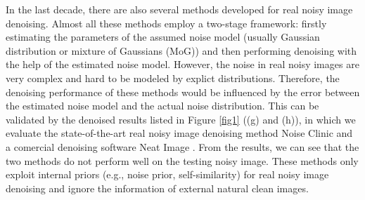 \documentclass[10pt,twocolumn,letterpaper]{article}
\begin{document}
In the last decade, there are also several methods \cite{crosschannel2016,fullyblind,rabie2005robust,Liu2008,almapg,noiseclinic,ncwebsite,Zhu_2016_CVPR} developed for real noisy image denoising. Almost all these methods employ a two-stage framework: firstly estimating the parameters of the assumed noise model (usually Gaussian distribution or mixture of Gaussians (MoG)) and then performing denoising with the help of the estimated noise model. However, the noise in real noisy images are very complex and hard to be modeled by explict distributions. Therefore, the denoising performance of these methods would be influenced by the error between the estimated noise model and the actual noise distribution. This can be validated by the   denoised results listed in Figure \ref{fig1} ((g) and (h)), in which we evaluate the state-of-the-art real noisy image denoising method Noise Clinic \cite{noiseclinic,ncwebsite} and a comercial denoising software Neat Image \cite{neatimage}. From the results, we can see that the two methods do not perform well on the testing noisy image. These methods only exploit internal priors (e.g., noise prior, self-similarity) for real noisy image denoising and ignore the information of external natural clean images. 
\end{document}
